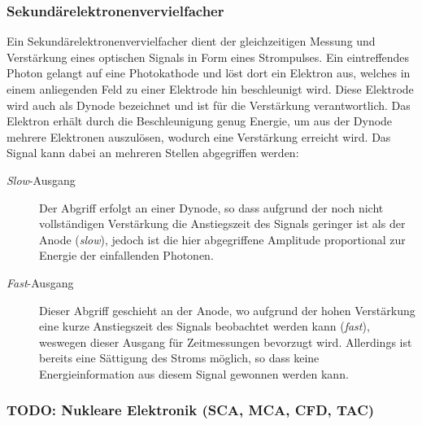 \documentclass[11pt, a4paper]{article}
\numberwithin{equation}{section}
\begin{document}
\subsubsection{Sekundärelektronenvervielfacher}

Ein Sekundärelektronenvervielfacher dient der gleichzeitigen Messung und Verstärkung eines optischen Signals in Form eines Strompulses.
Ein eintreffendes Photon gelangt auf eine Photokathode und löst dort ein Elektron aus, welches in einem anliegenden Feld zu einer Elektrode hin beschleunigt wird.
Diese Elektrode wird auch als Dynode bezeichnet und ist für die Verstärkung verantwortlich.
Das Elektron erhält durch die Beschleunigung genug Energie, um aus der Dynode mehrere Elektronen auszulösen, wodurch eine Verstärkung erreicht wird.
Das Signal kann dabei an mehreren Stellen abgegriffen werden:
\begin{description}
	\item[\textit{Slow}-Ausgang]Der Abgriff erfolgt an einer Dynode, so dass aufgrund der noch nicht vollständigen Verstärkung die Anstiegszeit des Signals geringer ist als der Anode (\textit{slow}), jedoch ist die hier abgegriffene Amplitude proportional zur Energie der einfallenden Photonen.
	\item[\textit{Fast}-Ausgang]Dieser Abgriff geschieht an der Anode, wo aufgrund der hohen Verstärkung eine kurze Anstiegszeit des Signals beobachtet werden kann (\textit{fast}), weswegen dieser Ausgang für Zeitmessungen bevorzugt wird. Allerdings ist bereits eine Sättigung des Stroms möglich, so dass keine Energieinformation aus diesem Signal gewonnen werden kann.
\end{description}

\subsubsection{TODO: Nukleare Elektronik (SCA, MCA, CFD, TAC)}
\end{document}
